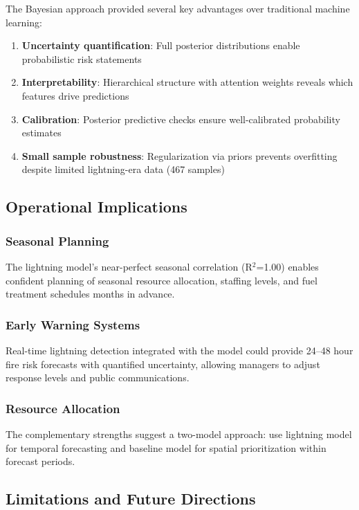 \documentclass[11pt,a4paper]{article}
\begin{document}
The Bayesian approach provided several key advantages over traditional machine learning:

\begin{enumerate}
    \item \textbf{Uncertainty quantification}: Full posterior distributions enable probabilistic risk statements
    \item \textbf{Interpretability}: Hierarchical structure with attention weights reveals which features drive predictions
    \item \textbf{Calibration}: Posterior predictive checks ensure well-calibrated probability estimates
    \item \textbf{Small sample robustness}: Regularization via priors prevents overfitting despite limited lightning-era data (467 samples)
\end{enumerate}

\subsection{Operational Implications}

\subsubsection{Seasonal Planning}
The lightning model's near-perfect seasonal correlation (R$^2$=1.00) enables confident planning of seasonal resource allocation, staffing levels, and fuel treatment schedules months in advance.

\subsubsection{Early Warning Systems}
Real-time lightning detection integrated with the model could provide 24--48 hour fire risk forecasts with quantified uncertainty, allowing managers to adjust response levels and public communications.

\subsubsection{Resource Allocation}
The complementary strengths suggest a two-model approach: use lightning model for temporal forecasting and baseline model for spatial prioritization within forecast periods.

\subsection{Limitations and Future Directions}
\end{document}
